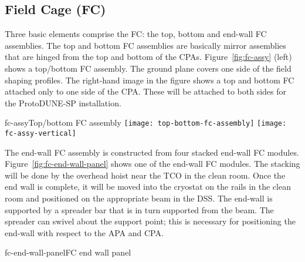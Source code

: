 \subsection{Field Cage (FC)}


Three basic elements comprise the FC: the top, bottom and end-wall FC assemblies.  The top and bottom FC assemblies are basically mirror assemblies that are hinged from the top and bottom of the CPAs. %
Figure~\ref{fig:fc-assy} (left) shows a top/bottom FC assembly.  The ground plane covers one side of the field shaping profiles.  The right-hand image in the figure shows a top and bottom FC attached only to one side of the CPA. %
These will be attached to both sides for the ProtoDUNE-SP installation.  

\begin{cdrfigure}{fc-assy}{Top/bottom FC assembly }
\texttt{[image: top-bottom-fc-assembly]}
\texttt{[image: fc-assy-vertical]}
\end{cdrfigure}

The end-wall FC assembly is constructed from four stacked end-wall FC modules.  Figure~\ref{fig:fc-end-wall-panel} shows one of the end-wall FC modules.  %
The stacking will be done by the overhead hoist near the TCO in the clean room.  Once the end wall is complete, it will be moved into the cryostat on the rails in the clean room and positioned on the appropriate beam in the DSS.   The end-wall is supported by a spreader bar that is in turn supported from the beam. The spreader can swivel about the support point;  this is necessary for positioning the end-wall with respect to the APA and CPA. %

\begin{cdrfigure}{fc-end-wall-panel}{FC end wall panel }
\end{cdrfigure}

